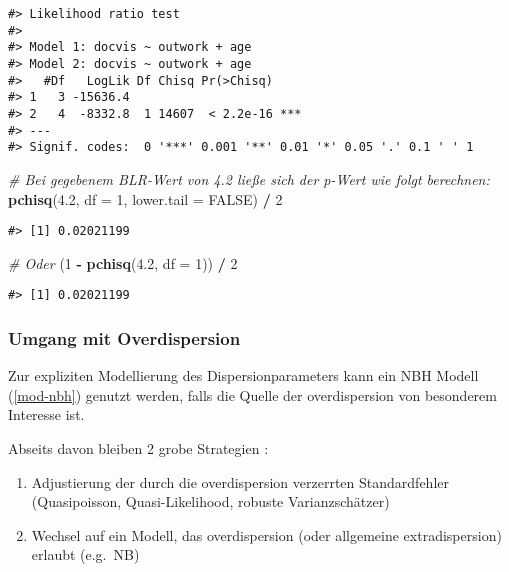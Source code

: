 \documentclass[ngerman,a4paper,]{scrartcl}
\newenvironment{Shaded}{\begin{snugshade}}{\end{snugshade}}
\newcommand{\CommentTok}[1]{\textcolor[rgb]{0.56,0.35,0.01}{\textit{#1}}}
\newcommand{\DataTypeTok}[1]{\textcolor[rgb]{0.13,0.29,0.53}{#1}}
\newcommand{\DecValTok}[1]{\textcolor[rgb]{0.00,0.00,0.81}{#1}}
\newcommand{\FloatTok}[1]{\textcolor[rgb]{0.00,0.00,0.81}{#1}}
\newcommand{\KeywordTok}[1]{\textcolor[rgb]{0.13,0.29,0.53}{\textbf{#1}}}
\newcommand{\NormalTok}[1]{#1}
\newcommand{\OperatorTok}[1]{\textcolor[rgb]{0.81,0.36,0.00}{\textbf{#1}}}
\newcommand{\OtherTok}[1]{\textcolor[rgb]{0.56,0.35,0.01}{#1}}
\newcommand{\StringTok}[1]{\textcolor[rgb]{0.31,0.60,0.02}{#1}}
\providecommand{\tightlist}{%
  \setlength{\itemsep}{0pt}\setlength{\parskip}{0pt}}
\theoremstyle{definition}
\theoremstyle{definition}
\theoremstyle{definition}
\theoremstyle{remark}
\begin{document}
\begin{verbatim}
#> Likelihood ratio test
#> 
#> Model 1: docvis ~ outwork + age
#> Model 2: docvis ~ outwork + age
#>   #Df   LogLik Df Chisq Pr(>Chisq)    
#> 1   3 -15636.4                        
#> 2   4  -8332.8  1 14607  < 2.2e-16 ***
#> ---
#> Signif. codes:  0 '***' 0.001 '**' 0.01 '*' 0.05 '.' 0.1 ' ' 1
\end{verbatim}

\begin{Shaded}
\begin{Highlighting}[]
\CommentTok{# Bei gegebenem BLR-Wert von 4.2 ließe sich der p-Wert wie folgt berechnen:}
\KeywordTok{pchisq}\NormalTok{(}\FloatTok{4.2}\NormalTok{, }\DataTypeTok{df =} \DecValTok{1}\NormalTok{, }\DataTypeTok{lower.tail =} \OtherTok{FALSE}\NormalTok{) }\OperatorTok{/}\StringTok{ }\DecValTok{2}
\end{Highlighting}
\end{Shaded}

\begin{verbatim}
#> [1] 0.02021199
\end{verbatim}

\begin{Shaded}
\begin{Highlighting}[]
\CommentTok{# Oder}
\NormalTok{(}\DecValTok{1} \OperatorTok{-}\StringTok{ }\KeywordTok{pchisq}\NormalTok{(}\FloatTok{4.2}\NormalTok{, }\DataTypeTok{df =} \DecValTok{1}\NormalTok{)) }\OperatorTok{/}\StringTok{ }\DecValTok{2}
\end{Highlighting}
\end{Shaded}

\begin{verbatim}
#> [1] 0.02021199
\end{verbatim}

\hypertarget{umgang-mit-overdispersion}{%
\subsubsection{Umgang mit Overdispersion}\label{umgang-mit-overdispersion}}

Zur expliziten Modellierung des Dispersionparameters kann ein NBH Modell (\ref{mod-nbh}) genutzt werden, falls die Quelle der overdispersion von besonderem Interesse ist.

Abseits davon bleiben 2 grobe Strategien :

\begin{enumerate}
\def\labelenumi{\arabic{enumi}.}
\tightlist
\item
  Adjustierung der durch die overdispersion verzerrten Standardfehler (Quasipoisson, Quasi-Likelihood, robuste Varianzschätzer)
\item
  Wechsel auf ein Modell, das overdispersion (oder allgemeine extradispersion) erlaubt (e.g.~NB)
\end{enumerate}
\end{document}
